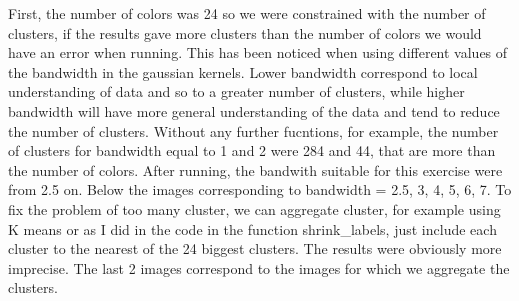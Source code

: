 \documentclass{ETHExercise}
\begin{document}
First, the number of colors was 24 so we were constrained with the number of clusters, 
if the results gave more clusters than the number of colors we would have an error when running.
This has been noticed when using different values of the bandwidth in the gaussian kernels.
Lower bandwidth correspond to local understanding of data and so to a greater number of clusters, 
while higher bandwidth will have more general understanding of the data and tend to reduce the number of 
clusters. Without any further fucntions, for example, the number of clusters for bandwidth equal to 1 and 2 were 284 and 44, that are more than the number of colors.
After running, the bandwith suitable for this exercise were from 2.5 on.
Below the images corresponding to bandwidth = 2.5, 3, 4, 5, 6, 7.
To fix the problem of too many cluster, we can aggregate cluster, for example using K means or as I did in the 
code in the function shrink\_labels, just include each cluster to the nearest of the 24 biggest clusters. The results were 
obviously more imprecise. The last 2 images correspond to the images for which we aggregate the clusters.

\end{document}
